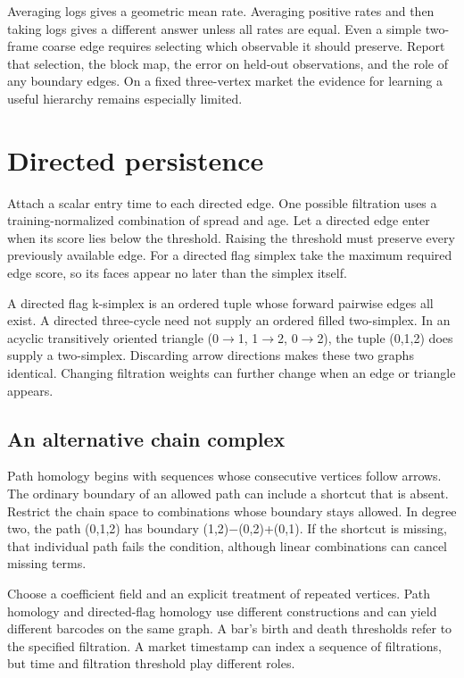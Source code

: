 \documentclass[11pt,oneside,openany]{book}
\begin{document}
Averaging logs gives a geometric mean rate. Averaging positive rates and then taking logs gives a different answer unless all rates are equal. Even a simple two-frame coarse edge requires selecting which observable it should preserve. Report that selection, the block map, the error on held-out observations, and the role of any boundary edges. On a fixed three-vertex market the evidence for learning a useful hierarchy remains especially limited.

\chapter{Directed persistence}
Attach a scalar entry time to each directed edge. One possible filtration uses a training-normalized combination of spread and age. Let a directed edge enter when its score lies below the threshold. Raising the threshold must preserve every previously available edge. For a directed flag simplex take the maximum required edge score, so its faces appear no later than the simplex itself.

A directed flag k-simplex is an ordered tuple whose forward pairwise edges all exist. A directed three-cycle need not supply an ordered filled two-simplex. In an acyclic transitively oriented triangle (0\ensuremath{\to}1, 1\ensuremath{\to}2, 0\ensuremath{\to}2), the tuple (0,1,2) does supply a two-simplex. Discarding arrow directions makes these two graphs identical. Changing filtration weights can further change when an edge or triangle appears.

\section*{An alternative chain complex}
Path homology begins with sequences whose consecutive vertices follow arrows. The ordinary boundary of an allowed path can include a shortcut that is absent. Restrict the chain space to combinations whose boundary stays allowed. In degree two, the path (0,1,2) has boundary (1,2)\ensuremath{-}(0,2)+(0,1). If the shortcut is missing, that individual path fails the condition, although linear combinations can cancel missing terms.

Choose a coefficient field and an explicit treatment of repeated vertices. Path homology and directed-flag homology use different constructions and can yield different barcodes on the same graph. A bar's birth and death thresholds refer to the specified filtration. A market timestamp can index a sequence of filtrations, but time and filtration threshold play different roles.
\end{document}
